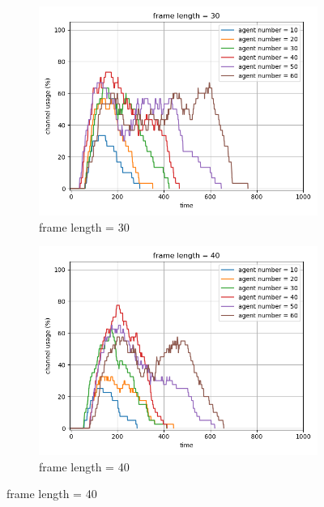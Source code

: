 \begin{figure}[htbp]
    \vspace{1cm}
    
    \begin{subfigure}[t]{0.45\linewidth}
        \centering
        \includegraphics[width=\linewidth]{figures/channel_usage_frame30.png}
        \caption{frame length = 30}
        \label{fig:framepercent3}
    \end{subfigure}
    \hfill
    \begin{subfigure}[t]{0.45\linewidth}
        \centering
        \includegraphics[width=\linewidth]{figures/channel_usage_frame40.png}
        \caption{frame length = 40}
        \label{fig:framepercent4}
    \end{subfigure}
    

\end{figure}
